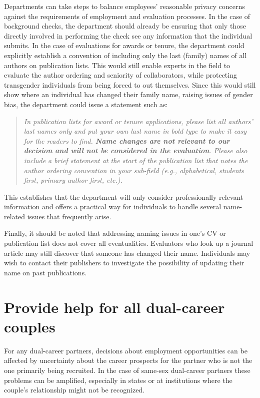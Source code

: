Departments can take steps to balance employees' reasonable privacy concerns against the requirements of employment and evaluation processes. In the case of background checks, the department should already be ensuring that only those directly involved in performing the check see any information that the individual submits. In the case of evaluations for awards or tenure, the department could explicitly establish a convention of including only the last (family) names of all authors on publication lists. This would still enable experts in the field to evaluate the author ordering and seniority of collaborators, while protecting transgender individuals from being forced to out themselves. Since this would still show where an individual has changed their family name, raising issues of gender bias, the department could issue a statement such as:
\begin{quote}
	\emph{In publication lists for award or tenure applications, please list all authors' last names only and put your own last name in bold type to make it easy for the readers to find. \textbf{Name changes are not relevant to our decision and will not be considered in the evaluation}. Please also include a brief statement at the start of the publication list that notes the author ordering convention in your sub-field (e.g., alphabetical, students first, primary author first, etc.).}
\end{quote}
This establishes that the department will only consider professionally relevant information and offers a practical way for individuals to handle several name-related issues that frequently arise.

Finally, it should be noted that addressing naming issues in one's CV or publication list does not cover all eventualities. Evaluators who look up a journal article may still discover that someone has changed their name. Individuals may wish to contact their publishers to investigate the possibility of updating their name on past publications.



\section {Provide help for all dual-career couples}
\label{dual-career}
For any dual-career partners, decisions about employment opportunities can be affected by uncertainty about the career prospects for the partner who is not the one primarily being recruited. In the case of same-sex dual-career partners these problems can be amplified, especially in states or at institutions where the couple's relationship might not be recognized.  

